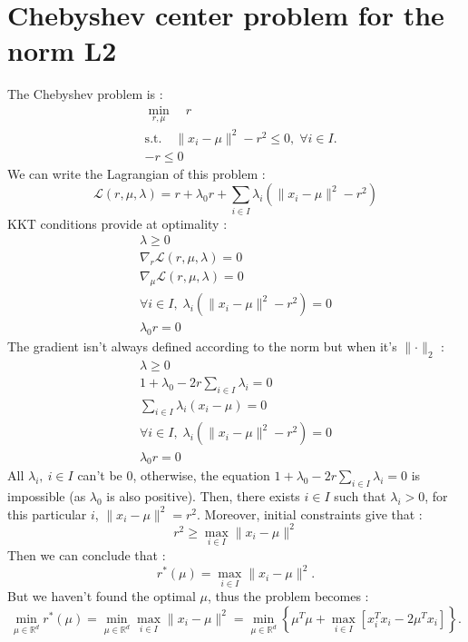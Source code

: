 \documentclass{amsart}
\newcommand{\RR}{\mathbb{R}}
\begin{document}
\section{Chebyshev center problem for the norm L2}
\label{chebyshev}
The Chebyshev problem is :
\begin{align*}
    &\min_{r,\mu} \quad r\\
    &\text{s.t.}\quad \lVert x_i-\mu\rVert^2-r^2 \leq 0, \;\forall i\in I.\\
    &-r\leq0
\end{align*}
We can write the Lagrangian of this problem : 
$$
\mathcal{L}(r,\mu,\lambda)=r+\lambda_0r+\sum_{i\in I}\lambda_i(\lVert x_i-\mu\rVert^2-r^2)
$$
KKT conditions provide at optimality : \begin{align*}
    \lambda\geq0\\
    \nabla_r\mathcal{L}(r,\mu,\lambda)=0\\
    \nabla_\mu\mathcal{L}(r,\mu,\lambda)=0\\
    \forall i\in I,\;\lambda_i(\lVert x_i-\mu\rVert^2-r^2)=0 \\
    \lambda_0r=0
\end{align*}
The gradient isn't always defined according to the norm but when it's $\lVert\cdot\rVert_2$ : 
\begin{align*}
    \lambda\geq0\\
    1+\lambda_0-2r\sum_{i\in I}\lambda_i=0\\
    \sum_{i\in I}\lambda_i(x_i-\mu)=0\\
    \forall i\in I,\;\lambda_i(\lVert x_i-\mu\rVert^2-r^2)=0 \\
    \lambda_0r=0
\end{align*}
All $\lambda_i, \: i\in I$ can't be $0$, otherwise, the equation $1+\lambda_0-2r\sum_{i\in I}\lambda_i=0$ is impossible (as $\lambda_0$ is also positive). Then, there exists $i\in I$ such that $\lambda_i>0$, for this particular $i$, $\lVert x_i-\mu\lVert^2=r^2$. Moreover, initial constraints give that :
$$
r^2\geq \max_{i\in I}\lVert x_i-\mu \rVert^2
$$
Then we can conclude that :
$$
r^*\left(\mu\right)=\max_{i\in I}\lVert x_i-\mu\rVert^2.
$$
But we haven't found the optimal $\mu$, thus the problem becomes : 
$$
\min_{\mu\in\RR^d}r^*\left(\mu\right)=\min_{\mu\in\RR^d}\max_{i\in I}\lVert x_i-\mu\rVert^2=\min_{\mu\in\RR^d}\left\{\mu^T\mu+\max_{i\in I}\left[x_i^Tx_i-2\mu^Tx_i\right]\right\}.
$$
\end{document}
